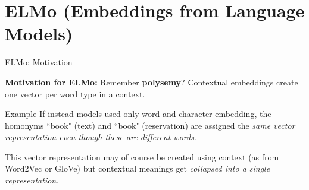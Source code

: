 

\section{ELMo (Embeddings from Language Models)}


\begin{frame}{ELMo: Motivation}

    \textbf{Motivation for ELMo: }Remember \textbf{polysemy}? Contextual embeddings create one vector per word type in a context. 
    
    \begin{exampleBlock}{Example}
        If instead models used only word and character embedding, the homonyms ``book" (text) and ``book" (reservation) are assigned the \emph{same vector representation even though these are different words}. 
        
        This vector representation may of course be created using context (as from Word2Vec or GloVe) but contextual meanings get \emph{collapsed into a single representation}.
    \end{exampleBlock}
    
    
\end{frame}



